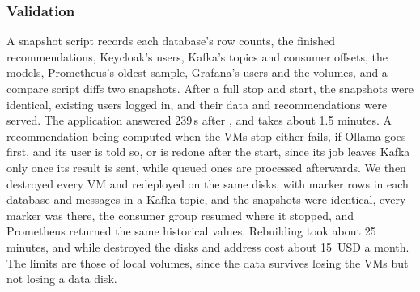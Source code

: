 \subsubsection{Validation} A snapshot script records each database's row counts, the finished recommendations, Keycloak's users, Kafka's topics and consumer offsets, the models, Prometheus's oldest sample, Grafana's users and the volumes, and a compare script diffs two snapshots. After a full stop and start, the snapshots were identical, existing users logged in, and their data and recommendations were served. The application answered 239\,s after , and  takes about 1.5 minutes. A recommendation being computed when the VMs stop either fails, if Ollama goes first, and its user is told so, or is redone after the start, since its job leaves Kafka only once its result is sent, while queued ones are processed afterwards. We then destroyed every VM and redeployed on the same disks, with marker rows in each database and messages in a Kafka topic, and the snapshots were identical, every marker was there, the consumer group resumed where it stopped, and Prometheus returned the same historical values. Rebuilding took about 25 minutes, and while destroyed the disks and address cost about 15~USD a month. The limits are those of local volumes, since the data survives losing the VMs but not losing a data disk.
